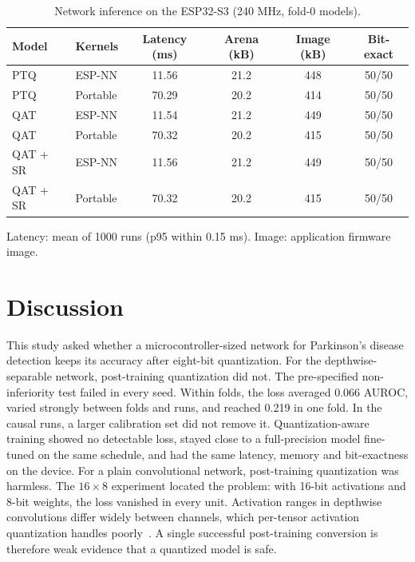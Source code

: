 \documentclass[preprint,12pt]{elsarticle}
\begin{document}
\begin{table}[!t]
\caption{Network inference on the ESP32-S3 (240 MHz, fold-0 models).}
\label{tab:board}
\centering\small
\begin{tabular}{@{}llcccc@{}}
\toprule
Model & Kernels & Latency (ms) & Arena (kB) & Image (kB) & Bit-exact \\
\midrule
PTQ & ESP-NN & 11.56 & 21.2 & 448 & 50/50 \\
PTQ & Portable & 70.29 & 20.2 & 414 & 50/50 \\
QAT & ESP-NN & 11.54 & 21.2 & 449 & 50/50 \\
QAT & Portable & 70.32 & 20.2 & 415 & 50/50 \\
QAT + SR & ESP-NN & 11.56 & 21.2 & 449 & 50/50 \\
QAT + SR & Portable & 70.32 & 20.2 & 415 & 50/50 \\
\bottomrule
\end{tabular}

\vspace{2pt}\parbox{\linewidth}{\footnotesize Latency: mean of 1000 runs (p95 within 0.15 ms). Image: application firmware image.}
\end{table}

\section{Discussion}
\label{sec:discussion}
This study asked whether a microcontroller-sized network for Parkinson's disease detection keeps its accuracy after eight-bit quantization. For the depthwise-separable network, post-training quantization did not. The pre-specified non-inferiority test failed in every seed. Within folds, the loss averaged 0.066 AUROC, varied strongly between folds and runs, and reached 0.219 in one fold. In the causal runs, a larger calibration set did not remove it. Quantization-aware training showed no detectable loss, stayed close to a full-precision model fine-tuned on the same schedule, and had the same latency, memory and bit-exactness on the device. For a plain convolutional network, post-training quantization was harmless. The $16\times8$ experiment located the problem: with 16-bit activations and 8-bit weights, the loss vanished in every unit. Activation ranges in depthwise convolutions differ widely between channels, which per-tensor activation quantization handles poorly~\cite{Krishnamoorthi2018,Nagel2021}. A single successful post-training conversion is therefore weak evidence that a quantized model is safe.
\end{document}

